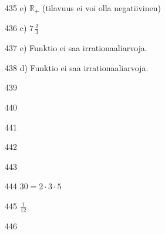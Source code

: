 \begin{Vastaus}{435}
	e) $\mathbb{R}_+$ (tilavuus ei voi olla negatiivinen)
	
\end{Vastaus}
\begin{Vastaus}{436}
	c) $7\,\frac{2}{3}$
	
\end{Vastaus}
\begin{Vastaus}{437}
	e) Funktio ei saa irrationaaliarvoja.
	
\end{Vastaus}
\begin{Vastaus}{438}
	d) Funktio ei saa irrationaaliarvoja.
	
\end{Vastaus}
\begin{Vastaus}{439}
	
\end{Vastaus}
\begin{Vastaus}{440}
	
\end{Vastaus}
\begin{Vastaus}{441}
	
\end{Vastaus}
\begin{Vastaus}{442}
	
\end{Vastaus}
\begin{Vastaus}{443}
	
\end{Vastaus}
\begin{Vastaus}{444}
	$30=2\cdot3\cdot5$
	
\end{Vastaus}
\begin{Vastaus}{445}
		$\frac{1}{12}$
	
\end{Vastaus}
\begin{Vastaus}{446}
\end{Vastaus}
